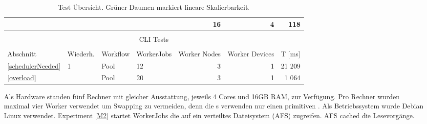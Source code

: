 \begin{table}[H]
\begin{tabular}{|l|l|l|l|r|r|r|}
                                      &                     &                           &                     & 16       & 4          & 118                      \\ \hline
\multicolumn{7}{|l|}{}                                                                                                                                           \\
\multicolumn{7}{|c|}{CLI Tests}                                                                                                                                  \\
\multicolumn{7}{|l|}{}                                                                                                                                           \\ \hline
Abschnitt                             & Wiederh.            & Workflow                  & WorkerJobs          & Worker Nodes & Worker Devices & T {[}ms{]}       \\ \hline
\ref{schedulerNeeded}                 & \multirow{2}{*}{1}  & Pool                      & 12                  & 3        & 1          & 21 209                   \\ \cline{1-1} \cline{3-7}
\ref{overload}                        &                     & Pool                      & 20                  & 3        & 1          & 1 064                    \\ \hline
\end{tabular}

\caption{Test Übersicht. Grüner Daumen markiert lineare Skalierbarkeit.}
\label{testtable}
\end{table}


\noindent Als Hardware standen fünf Rechner mit gleicher Ausstattung, jeweils 4 Cores und 16GB RAM, zur Verfügung.
Pro Rechner wurden maximal vier Worker verwendet um Swapping zu vermeiden, denn die \jobScript s verwenden nur einen primitiven \scheduler{}.
Als Betriebssystem wurde Debian Linux verwendet.
Experiment \ref{M2} startet WorkerJobs die auf ein verteiltes Dateisystem (AFS) zugreifen. AFS cached die Lesevorgänge.



















